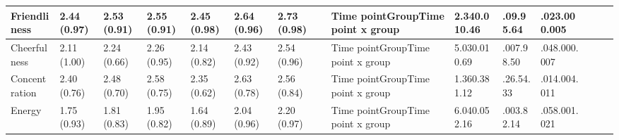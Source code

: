 \documentclass[authordate, empirical]{jote-new-article}
\begin{document}
\begin{table}
\begin{tabularx}{\linewidth}{@{} l l l l l l l l l l l l l l l @{}}
    \hline Friendliness                            & 2.44 (0.97)                                   & 2.53 (0.91)          & 2.55 (0.91)                       & 2.45 (0.98)
                                                   & 2.64 (0.96)                                   & 2.73 (0.98)          &                                   & Time pointGroupTime point x group & 2.340.010.46
                                                   & .09.95.64                                     & .023.000.005                                                                                                                                                        \\

    \hline Cheerfulness                            & 2.11 (1.00)                                   & 2.24 (0.66)          & 2.26 (0.95)                       & 2.14 (0.82)
                                                   & 2.43 (0.92)                                   & 2.54 (0.96)          &                                   & Time pointGroupTime point x group & 5.030.010.69
                                                   & .007.98.50                                    & .048.000.007                                                                                                                                                        \\

    \hline Concentration                           & 2.40 (0.76)                                   & 2.48 (0.70)          & 2.58 (0.75)                       & 2.35 (0.62)
                                                   & 2.63 (0.78)                                   & 2.56 (0.84)          &                                   & Time pointGroupTime point x group & 1.360.381.12
                                                   & .26.54.33                                     & .014.004.011                                                                                                                                                        \\

    \hline Energy                                  & 1.75 (0.93)                                   & 1.81 (0.83)          & 1.95 (0.82)                       & 1.64 (0.89)                       & 2.04 (0.96)
                                                   & 2.20 (0.97)                                   &                      & Time pointGroupTime point x group & 6.040.052.16                      & .003.82.14
                                                   & .058.001.021                                                                                                                                                                                                        \\


\end{tabularx}
\end{table}
\end{document}
